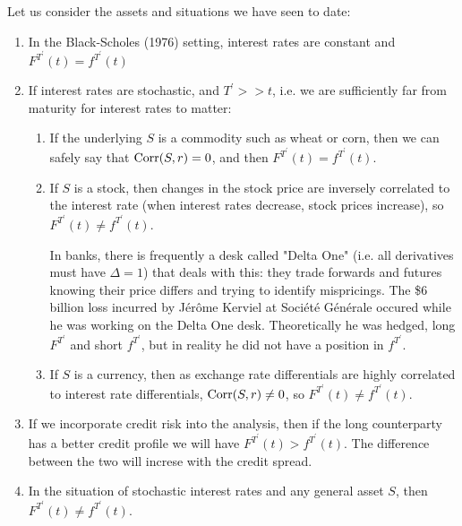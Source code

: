 \documentclass[11pt]{article}
\begin{document}
Let us consider the assets and situations we have seen to date:
\begin{enumerate}
\item In the Black-Scholes (1976) setting, interest rates are constant and $F^{T^\prime}(t) = f^{T^\prime}(t)$
\item If interest rates are stochastic, and $T^\prime >> t$, i.e. we are sufficiently far from maturity for interest rates to matter:
\begin{enumerate}
\item If the underlying $S$ is a commodity such as wheat or corn, then we can safely say that $\operatorname{\mathrm Corr}(S, r) = 0$, and then $F^{T^\prime}(t) = f^{T^\prime}(t)$.
\item If $S$ is a stock, then changes in the stock price are inversely correlated to the interest rate (when interest rates decrease, stock prices increase), so $F^{T^\prime}(t) \neq f^{T^\prime}(t)$.

\begin{remark}
In banks, there is frequently a desk called "Delta One" (i.e. all derivatives must have $\Delta=1$) that deals with this: they trade forwards and futures knowing their price differs and trying to identify mispricings. The \$6 billion loss incurred by Jérôme Kerviel at Société Générale occured while he was working on the Delta One desk. Theoretically he was hedged, long $F^{T^\prime}$ and short $f^{T^\prime}$, but in reality he did not have a position in $f^{T^\prime}$.
\end{remark}

\item If $S$ is a currency, then as exchange rate differentials are highly correlated to interest rate differentials, $\operatorname{\mathrm Corr}(S, r) \neq 0$, so $F^{T^\prime}(t) \neq f^{T^\prime}(t)$.
\end{enumerate}
\item If we incorporate credit risk into the analysis, then if the long counterparty has a better credit profile we will have $F^{T^\prime}(t) > f^{T^\prime}(t)$. The difference between the two will increse with the credit spread.
\item In the situation of stochastic interest rates and any general asset $S$, then $F^{T^\prime}(t) \neq f^{T^\prime}(t)$.
\end{enumerate}
\end{document}
